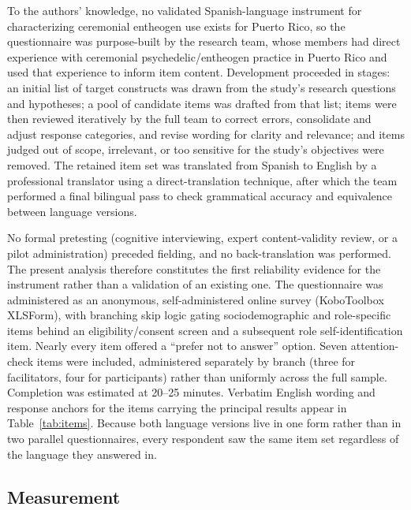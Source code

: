 \documentclass[12pt]{article}
\begin{document}
To the authors' knowledge, no validated Spanish-language instrument for characterizing ceremonial entheogen
use exists for Puerto Rico, so the questionnaire was purpose-built by the research team, whose members had
direct experience with ceremonial psychedelic/entheogen practice in Puerto Rico and used that experience to
inform item content. Development proceeded in stages: an initial list of target constructs was drawn from
the study's research questions and hypotheses; a pool of candidate items was drafted from that list; items
were then reviewed iteratively by the full team to correct errors, consolidate and adjust response
categories, and revise wording for clarity and relevance; and items judged out of scope, irrelevant, or too
sensitive for the study's objectives were removed. The retained item set was translated from Spanish to
English by a professional translator using a direct-translation technique, after which the team performed a
final bilingual pass to check grammatical accuracy and equivalence between language versions.

No formal pretesting (cognitive interviewing, expert content-validity review, or a pilot administration)
preceded fielding, and no back-translation was performed. The present analysis therefore constitutes the
first reliability evidence for the instrument rather than a validation of an existing one. The questionnaire
was administered as an anonymous, self-administered online survey (KoboToolbox XLSForm), with branching skip
logic gating sociodemographic and role-specific items behind an eligibility/consent screen and a subsequent
role self-identification item. Nearly every item offered a ``prefer not to answer'' option. Seven
attention-check items were included, administered separately by branch (three for facilitators, four for
participants) rather than uniformly across the full sample. Completion was estimated at 20--25 minutes.
Verbatim English wording and response anchors for the items carrying the principal results appear in
Table~\ref{tab:items}. Because both language versions live in one form rather than in two parallel
questionnaires, every respondent saw the same item set regardless of the language they answered in.

\subsection{Measurement}
\end{document}
